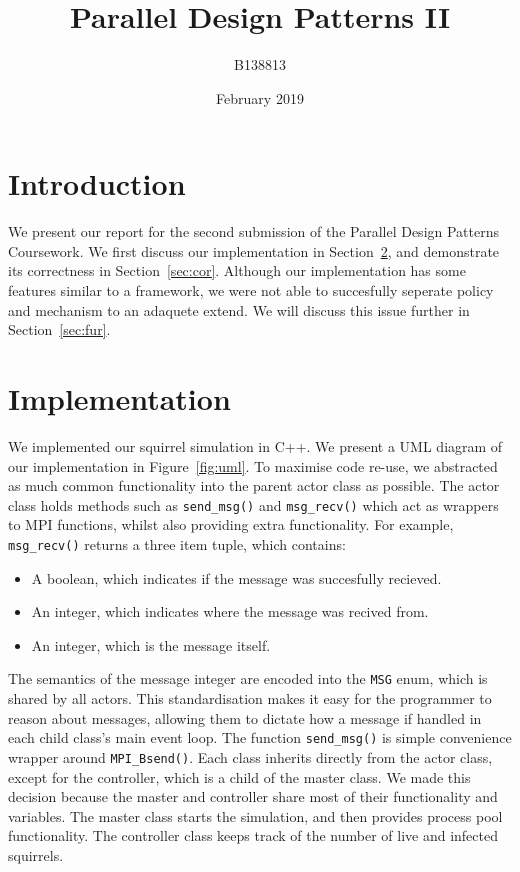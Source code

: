 \documentclass[oneside]{article}
\title{Parallel Design Patterns II}
\author{B138813}
\date{February 2019}
\begin{document}

\maketitle
\section{Introduction}
We present our report for the second submission of the Parallel Design Patterns Coursework. We first discuss our implementation in Section~\ref{sec:imp}, and demonstrate its correctness in Section~\ref{sec:cor}. Although our implementation has some features similar to a framework, we were not able to succesfully seperate policy and mechanism to an adaquete extend. We will discuss this issue further in Section~\ref{sec:fur}.



\section{Implementation}\label{sec:imp}
We implemented our squirrel simulation in C++. We present a UML diagram of our implementation in Figure~\ref{fig:uml}. To maximise code re-use, we abstracted as much common functionality into the parent actor class as possible. The actor class holds methods such as \texttt{send\_msg()} and \texttt{msg\_recv()} which act as wrappers to MPI functions, whilst also providing extra functionality. For example, \texttt{msg\_recv()} returns a three item tuple, which contains:

\begin{itemize}
  \item A boolean, which indicates if the message was succesfully recieved.
  \item An integer, which indicates where the message was recived from.
  \item An integer, which is the message itself.
\end{itemize}
The semantics of the message integer are encoded into the \texttt{MSG} enum, which is shared by all actors. This standardisation makes it easy for the programmer to reason about messages, allowing them to dictate how a message if handled in each child class's main event loop. The function \texttt{send\_msg()} is simple convenience wrapper around \texttt{MPI\_Bsend()}. Each class inherits directly from the actor class, except for the controller, which is a child of the master class. We made this decision because the master and controller share most of their functionality and variables. The master class starts the simulation, and then provides process pool functionality. The controller class keeps track of the number of live and infected squirrels.
\end{document}
